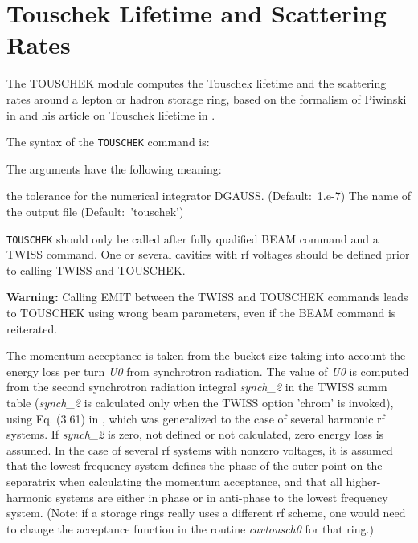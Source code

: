 
\chapter{Touschek Lifetime and Scattering Rates}

The TOUSCHEK module computes the Touschek lifetime and the scattering
rates around a lepton or hadron storage ring, based on the formalism of
Piwinski in \cite{Piwinski1998} and his article on Touschek lifetime in
\cite{chaotigner1999}.

The syntax of the \texttt{TOUSCHEK} command is: 

The arguments have the following meaning: 
\begin{madlist}
    the tolerance for the numerical integrator
   DGAUSS. (Default:~1.e-7) 
    The name of the output file (Default:~'touschek') 
\end{madlist}

\texttt{TOUSCHEK} should only be called after fully qualified BEAM
command and a TWISS command. One or several cavities with rf voltages
should be defined prior to calling TWISS and TOUSCHEK. 

{\bf Warning:} Calling EMIT between the TWISS and TOUSCHEK commands
leads to TOUSCHEK using wrong beam parameters, even if the BEAM command
is reiterated.  
 
The momentum acceptance is taken from the bucket size taking into
account the  energy loss per turn \textit{U0} from synchrotron
radiation. The value of \textit{U0} is computed from the second
synchrotron radiation integral \textit{synch\_2} in the TWISS summ table
(\textit{synch\_2} is calculated only when the TWISS option 'chrom' is
invoked), using Eq. (3.61) in \cite{sands1970}, which was
generalized to the case of several harmonic rf systems. 
If \textit{synch\_2} is zero, not defined or not calculated, zero energy
loss is assumed. In the case of several rf systems with nonzero
voltages, it is assumed that the lowest frequency system defines the
phase of the outer point on the separatrix when calculating the momentum
acceptance, and that all higher-harmonic systems are either in phase or
in anti-phase to the lowest frequency system. (Note: if a storage rings
really uses a different rf scheme, one would need to change the
acceptance function in the routine \textit{cavtousch0} for that ring.) 


